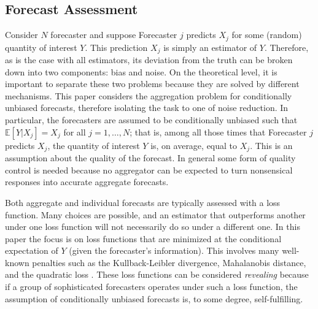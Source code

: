 \documentclass[11pt]{article}
\newcommand{\E}{\mathbb{E}}
\theoremstyle{definition}
\theoremstyle{definition}
\def\E{{\mathbb E}}
\begin{document}
\subsection{Forecast Assessment}
\label{context}



Consider $N$ forecaster and suppose Forecaster $j$ predicts $X_j$ for some (random) quantity of interest $Y$. This prediction $X_j$ is simply an estimator of $Y$. Therefore, as is the case with all estimators, 
its deviation from the truth can be broken down into two components: bias and noise. On the
theoretical level, it is important to separate these two problems because they are solved by different mechanisms.  This
paper considers the aggregation problem for conditionally unbiased forecasts,
therefore isolating the task to one of noise reduction. In particular, the forecasters are assumed to be conditionally unbiased such that $\E[Y | X_j] = X_j$ for all $j = 1, \dots, N$; that is, among all those times that Forecaster $j$ predicts $X_j$, the quantity of interest $Y$ is, on average, equal to $X_j$. This is an assumption about the quality of the forecast. In general some form of quality control is needed because no aggregator can be expected to turn nonsensical responses into accurate aggregate forecasts. 


%

Both aggregate and individual forecasts are typically assessed with a loss
function.
Many choices are possible, and
an estimator that outperforms another under one loss function will not
necessarily do so under a different one. In this paper  the focus is on loss functions that are minimized at the conditional expectation of $Y$ (given the forecaster's information).  This involves many well-known penalties such as the Kullback-Leibler divergence, Mahalanobis distance, and the quadratic loss \citep{banerjee2005optimality}. These loss functions can be considered \textit{revealing} because if a group of
sophisticated forecasters operates under such a loss function,
the assumption of conditionally unbiased forecasts is, to some degree,
self-fulfilling. 
\end{document}
